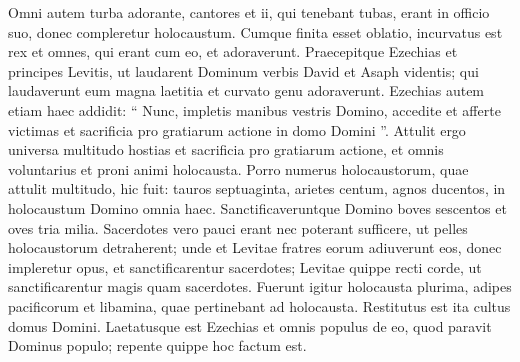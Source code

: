 \begin{biblechapter}
\begin{biblechapter}
\begin{biblechapter}
\begin{biblechapter}
\begin{biblechapter}
\begin{biblechapter}
\begin{biblechapter}
\begin{biblechapter}
\begin{biblechapter}
\begin{biblechapter}
\begin{biblechapter}
\begin{biblechapter}
\begin{biblechapter}
\begin{biblechapter}
\begin{biblechapter}
\begin{biblechapter}
\begin{biblechapter}
\begin{biblechapter}
\begin{biblechapter}
\begin{biblechapter}
\begin{biblechapter}
\begin{biblechapter}
\begin{biblechapter}
\begin{biblechapter}
\begin{biblechapter}
\begin{biblechapter}
\begin{biblechapter}
\begin{biblechapter}
\begin{biblechapter}
\verse Omni autem turba adorante, cantores et ii, qui tenebant tubas, erant in officio suo, donec compleretur holocaustum. 
\verse Cumque finita esset oblatio, incurvatus est rex et omnes, qui erant cum eo, et adoraverunt. 
\verse Praecepitque Ezechias et principes Levitis, ut laudarent Dominum verbis David et Asaph videntis; qui laudaverunt eum magna laetitia et curvato genu adoraverunt.
 \verse Ezechias autem etiam haec addidit: “ Nunc, impletis manibus vestris Domino, accedite et afferte victimas et sacrificia pro gratiarum actione in domo Domini ”. Attulit ergo universa multitudo hostias et sacrificia pro gratiarum actione, et omnis voluntarius et proni animi holocausta. 
\verse Porro numerus holocaustorum, quae attulit multitudo, hic fuit: tauros septuaginta, arietes centum, agnos ducentos, in holocaustum Domino omnia haec. 
\verse Sanctificaveruntque Domino boves sescentos et oves tria milia. 
\verse Sacerdotes vero pauci erant nec poterant sufficere, ut pelles holocaustorum detraherent; unde et Levitae fratres eorum adiuverunt eos, donec impleretur opus, et sanctificarentur sacerdotes; Levitae quippe recti corde, ut sanctificarentur magis quam sacerdotes. 
\verse Fuerunt igitur holocausta plurima, adipes pacificorum et libamina, quae pertinebant ad holocausta.
 Restitutus est ita cultus domus Domini. 
\verse Laetatusque est Ezechias et omnis populus de eo, quod paravit Dominus populo; repente quippe hoc factum est.
 

\end{biblechapter}
\end{biblechapter}
\end{biblechapter}
\end{biblechapter}
\end{biblechapter}
\end{biblechapter}
\end{biblechapter}
\end{biblechapter}
\end{biblechapter}
\end{biblechapter}
\end{biblechapter}
\end{biblechapter}
\end{biblechapter}
\end{biblechapter}
\end{biblechapter}
\end{biblechapter}
\end{biblechapter}
\end{biblechapter}
\end{biblechapter}
\end{biblechapter}
\end{biblechapter}
\end{biblechapter}
\end{biblechapter}
\end{biblechapter}
\end{biblechapter}
\end{biblechapter}
\end{biblechapter}
\end{biblechapter}
\end{biblechapter}
